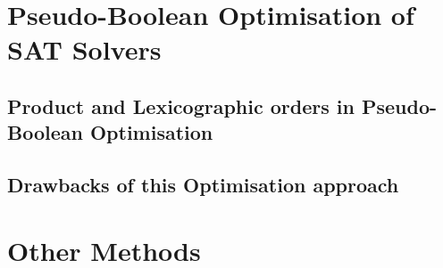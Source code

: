 \section{Pseudo-Boolean Optimisation of SAT Solvers}



\subsection{Product and Lexicographic orders in Pseudo-Boolean Optimisation}

\subsection{Drawbacks of this Optimisation approach}








\section{Other Methods}
